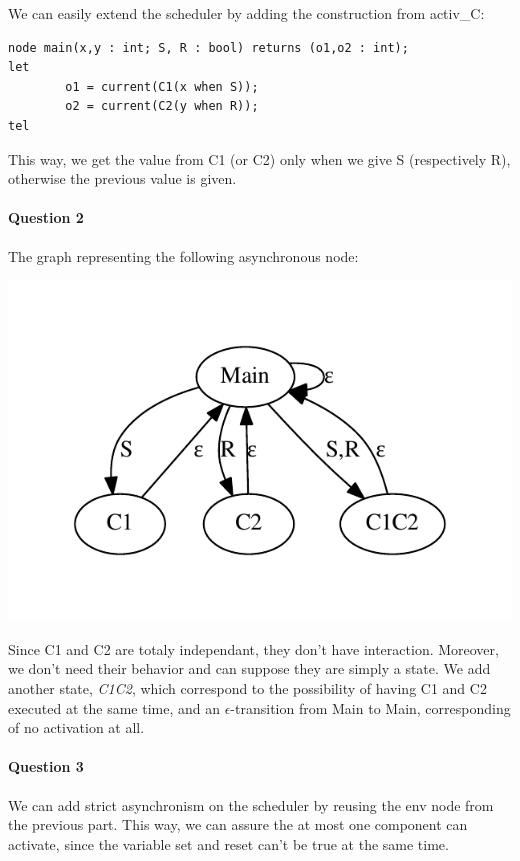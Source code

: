 \documentclass{article}
\begin{document}
We can easily extend the scheduler by adding the construction from activ\_C:

\begin{verbatim}
node main(x,y : int; S, R : bool) returns (o1,o2 : int);
let
        o1 = current(C1(x when S));
        o2 = current(C2(y when R));
tel
\end{verbatim}

This way, we get the value from C1 (or C2) only when we give S (respectively R),
otherwise the previous value is given.

\paragraph{Question 2}

The graph representing the following asynchronous node:

\begin{center}
\includegraphics{asyn_1.pdf}
\end{center}

Since C1 and C2 are totaly independant, they don't have interaction. Moreover,
we don't need their behavior and can suppose they are simply a state. We add
another state, \emph{C1C2}, which correspond to the possibility of having C1 and
C2 executed at the same time, and an $\epsilon$-transition from Main to Main,
corresponding of no activation at all.

\paragraph{Question 3}

We can add strict asynchronism on the scheduler by reusing the env node from the
previous part. This way, we can assure the at most one component can activate,
since the variable set and reset can't be true at the same time.
\end{document}
